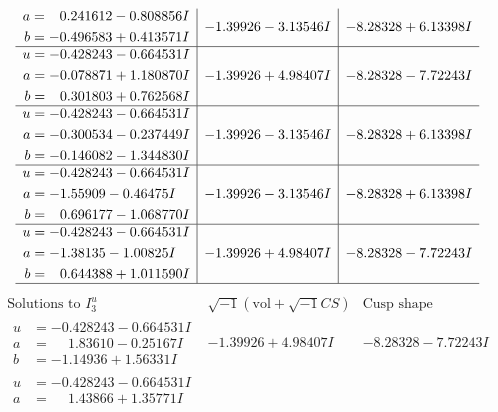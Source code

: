\documentclass[1p]{elsarticle_modified}
\theoremstyle{definition}
\newcommand{\I}{\sqrt{-1}}
\begin{document}
$$\begin{array}{c|c|c}
\begin{aligned}
a &= \phantom{-}0.241612 - 0.808856 I \\
b &= -0.496583 + 0.413571 I\end{aligned}
 & -1.39926 - 3.13546 I & -8.28328 + 6.13398 I \\ \hline\begin{aligned}
u &= -0.428243 - 0.664531 I \\
a &= -0.078871 + 1.180870 I \\
b &= \phantom{-}0.301803 + 0.762568 I\end{aligned}
 & -1.39926 + 4.98407 I & -8.28328 - 7.72243 I \\ \hline\begin{aligned}
u &= -0.428243 - 0.664531 I \\
a &= -0.300534 - 0.237449 I \\
b &= -0.146082 - 1.344830 I\end{aligned}
 & -1.39926 - 3.13546 I & -8.28328 + 6.13398 I \\ \hline\begin{aligned}
u &= -0.428243 - 0.664531 I \\
a &= -1.55909 - 0.46475 I \\
b &= \phantom{-}0.696177 - 1.068770 I\end{aligned}
 & -1.39926 - 3.13546 I & -8.28328 + 6.13398 I \\ \hline\begin{aligned}
u &= -0.428243 - 0.664531 I \\
a &= -1.38135 - 1.00825 I \\
b &= \phantom{-}0.644388 + 1.011590 I\end{aligned}
 & -1.39926 + 4.98407 I & -8.28328 - 7.72243 I\\
 \hline 
 \end{array}$$\newpage$$\begin{array}{c|c|c}  
\text{Solutions to }I^u_{3}& \I (\text{vol} + \sqrt{-1}CS) & \text{Cusp shape}\\
 \hline 
\begin{aligned}
u &= -0.428243 - 0.664531 I \\
a &= \phantom{-}1.83610 - 0.25167 I \\
b &= -1.14936 + 1.56331 I\end{aligned}
 & -1.39926 + 4.98407 I & -8.28328 - 7.72243 I \\ \hline\begin{aligned}
u &= -0.428243 - 0.664531 I \\
a &= \phantom{-}1.43866 + 1.35771 I \\

\end{aligned}
\end{array}$$
\end{document}
